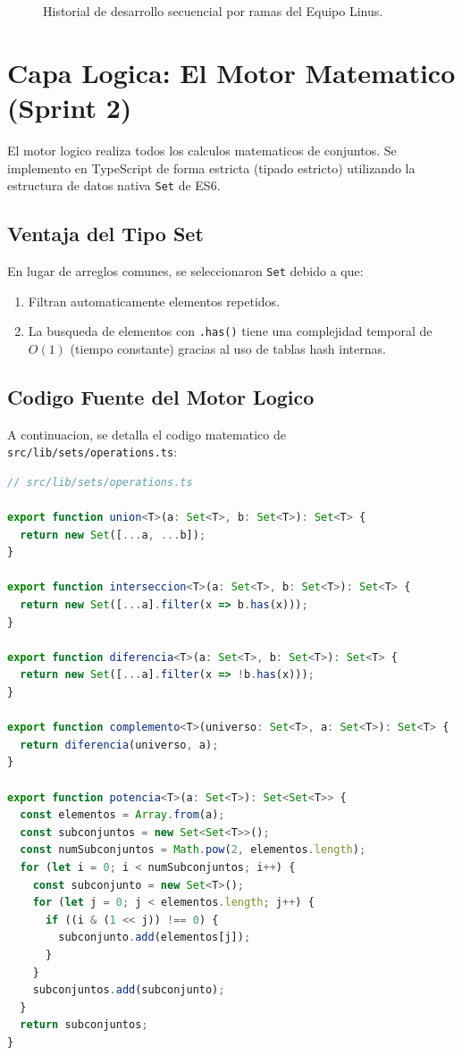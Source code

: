 \documentclass[12pt,a4paper]{article}
\begin{document}
\begin{figure}[H]
    \centering
    \caption{Historial de desarrollo secuencial por ramas del Equipo Linus.}
    \label{fig:ramas}
\end{figure}

\section{Capa Logica: El Motor Matematico (Sprint 2)}
El motor logico realiza todos los calculos matematicos de conjuntos. Se implemento en TypeScript de forma estricta (tipado estricto) utilizando la estructura de datos nativa \texttt{Set} de ES6.

\subsection{Ventaja del Tipo Set}
En lugar de arreglos comunes, se seleccionaron \texttt{Set} debido a que:
\begin{enumerate}
    \item Filtran automaticamente elementos repetidos.
    \item La busqueda de elementos con \texttt{.has()} tiene una complejidad temporal de $O(1)$ (tiempo constante) gracias al uso de tablas hash internas.
\end{enumerate}

\subsection{Codigo Fuente del Motor Logico}
A continuacion, se detalla el codigo matematico de \texttt{src/lib/sets/operations.ts}:

\begin{lstlisting}[language=TypeScript, caption=Codigo de operaciones de conjuntos]
// src/lib/sets/operations.ts

export function union<T>(a: Set<T>, b: Set<T>): Set<T> {
  return new Set([...a, ...b]);
}

export function interseccion<T>(a: Set<T>, b: Set<T>): Set<T> {
  return new Set([...a].filter(x => b.has(x)));
}

export function diferencia<T>(a: Set<T>, b: Set<T>): Set<T> {
  return new Set([...a].filter(x => !b.has(x)));
}

export function complemento<T>(universo: Set<T>, a: Set<T>): Set<T> {
  return diferencia(universo, a);
}

export function potencia<T>(a: Set<T>): Set<Set<T>> {
  const elementos = Array.from(a);
  const subconjuntos = new Set<Set<T>>();
  const numSubconjuntos = Math.pow(2, elementos.length);
  for (let i = 0; i < numSubconjuntos; i++) {
    const subconjunto = new Set<T>();
    for (let j = 0; j < elementos.length; j++) {
      if ((i & (1 << j)) !== 0) {
        subconjunto.add(elementos[j]);
      }
    }
    subconjuntos.add(subconjunto);
  }
  return subconjuntos;
}
\end{lstlisting}
\end{document}
